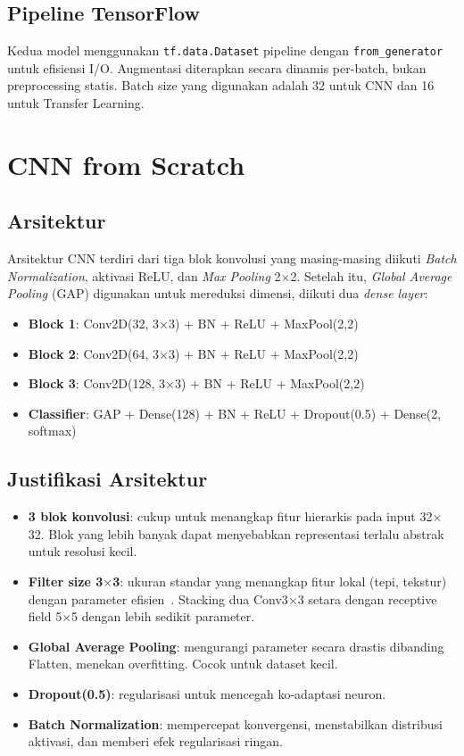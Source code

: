 \documentclass[conference]{IEEEtran}
\begin{document}
\subsection{Pipeline TensorFlow}\label{sec:pipeline}
Kedua model menggunakan \texttt{tf.data.Dataset} pipeline dengan \texttt{from\_generator} untuk efisiensi I/O. Augmentasi diterapkan secara dinamis per-batch, bukan preprocessing statis. Batch size yang digunakan adalah 32 untuk CNN dan 16 untuk Transfer Learning.

\section{CNN from Scratch}
\subsection{Arsitektur}
Arsitektur CNN terdiri dari tiga blok konvolusi yang masing-masing diikuti \textit{Batch Normalization}, aktivasi ReLU, dan \textit{Max Pooling} 2$\times$2. Setelah itu, \textit{Global Average Pooling} (GAP) digunakan untuk mereduksi dimensi, diikuti dua \textit{dense layer}:
\begin{itemize}
\item \textbf{Block 1}: Conv2D(32, 3$\times$3) + BN + ReLU + MaxPool(2,2)
\item \textbf{Block 2}: Conv2D(64, 3$\times$3) + BN + ReLU + MaxPool(2,2)
\item \textbf{Block 3}: Conv2D(128, 3$\times$3) + BN + ReLU + MaxPool(2,2)
\item \textbf{Classifier}: GAP + Dense(128) + BN + ReLU + Dropout(0.5) + Dense(2, softmax)
\end{itemize}

\subsection{Justifikasi Arsitektur}
\begin{itemize}
\item \textbf{3 blok konvolusi}: cukup untuk menangkap fitur hierarkis pada input 32$\times$32. Blok yang lebih banyak dapat menyebabkan representasi terlalu abstrak untuk resolusi kecil.
\item \textbf{Filter size 3$\times$3}: ukuran standar yang menangkap fitur lokal (tepi, tekstur) dengan parameter efisien~\cite{simonyan2014}. Stacking dua Conv3$\times$3 setara dengan receptive field 5$\times$5 dengan lebih sedikit parameter.
\item \textbf{Global Average Pooling}: mengurangi parameter secara drastis dibanding Flatten, menekan overfitting. Cocok untuk dataset kecil.
\item \textbf{Dropout(0.5)}: regularisasi untuk mencegah ko-adaptasi neuron.
\item \textbf{Batch Normalization}: mempercepat konvergensi, menstabilkan distribusi aktivasi, dan memberi efek regularisasi ringan.
\end{itemize}
\end{document}
